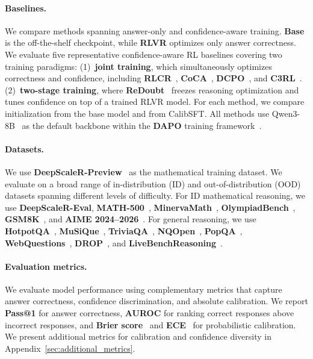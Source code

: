 \documentclass{article} %
\begin{document}
\paragraph{Baselines.}
We compare methods spanning answer-only and confidence-aware training. \textbf{Base}
is the off-the-shelf checkpoint, while \textbf{RLVR} optimizes only answer correctness.
We evaluate five representative confidence-aware RL baselines covering two training paradigms:
(1)~\textbf{joint training}, which simultaneously optimizes correctness and confidence, including \textbf{RLCR}~\citep{damani2026beyond}, \textbf{CoCA}~\citep{li2026confidence}, \textbf{DCPO}~\citep{ma2026decoupling}, and \textbf{C3RL}~\citep{yang2026scaling}.
(2)~\textbf{two-stage training}, where \textbf{ReDoubt}~\citep{bani2026rewarding} freezes reasoning optimization and tunes confidence on top of a trained RLVR model.
For each method, we compare initialization from the base model and from CalibSFT.
All methods use Qwen3-8B~\citep{yang2025qwen3} as the default backbone within the \textbf{DAPO} training framework~\citep{yu2025dapo}.


\paragraph{Datasets.}
We use \textbf{DeepScaleR-Preview}~\citep{deepscaler2025} as the mathematical training dataset.
We evaluate on a broad range of in-distribution (ID) and out-of-distribution (OOD)
datasets spanning different levels of difficulty.
For ID mathematical reasoning, we use \textbf{DeepScaleR-Eval},
\textbf{MATH-500}~\citep{hendrycks2021math}, \textbf{MinervaMath}~\citep{lewkowycz2022minerva},
\textbf{OlympiadBench}~\citep{he2024olympiadbench}, \textbf{GSM8K}~\citep{cobbe2021gsm8k}, and
\textbf{AIME 2024--2026}~\citep{dekoninck2026matharena}.
For general reasoning, we use \textbf{HotpotQA}~\citep{yang2018hotpotqa},
\textbf{MuSiQue}~\citep{trivedi2022musique}, \textbf{TriviaQA}~\citep{joshi2017triviaqa},
\textbf{NQOpen}~\citep{lee2019latent}, \textbf{PopQA}~\citep{mallen2023trust},
\textbf{WebQuestions}~\citep{berant2013semantic}, \textbf{DROP}~\citep{dua2019drop}, and
\textbf{LiveBenchReasoning}~\citep{white2025livebench}.

\paragraph{Evaluation metrics.}
We evaluate model performance using complementary metrics that capture answer
correctness, confidence discrimination, and absolute calibration. We report \textbf{Pass@1} for answer
correctness, \textbf{AUROC} for ranking correct responses above incorrect responses, and
\textbf{Brier score}~\citep{brier1950verification} and
\textbf{ECE}~\citep{guo2017calibration} for probabilistic calibration.
We present additional metrics for calibration and confidence diversity in Appendix~\ref{sec:additional_metrics}.
\end{document}
